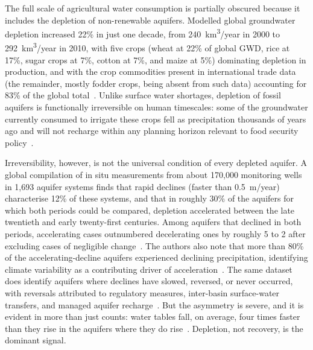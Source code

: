 The full scale of agricultural water consumption is partially obscured because it includes the depletion of non-renewable aquifers. Modelled global groundwater depletion increased 22\% in just one decade, from 240~km\textsuperscript{3}/year in 2000 to 292~km\textsuperscript{3}/year in 2010, with five crops (wheat at 22\% of global GWD, rice at 17\%, sugar crops at 7\%, cotton at 7\%, and maize at 5\%) dominating depletion in production, and with the crop commodities present in international trade data (the remainder, mostly fodder crops, being absent from such data) accounting for 83\% of the global total~\cite[p.~701, Fig.~1]{dalin2017groundwater}. Unlike surface water shortages, depletion of fossil aquifers is functionally irreversible on human timescales: some of the groundwater currently consumed to irrigate these crops fell as precipitation thousands of years ago and will not recharge within any planning horizon relevant to food security policy~\cite[pp.~6--7]{kuang2024groundwater}.

Irreversibility, however, is not the universal condition of every depleted aquifer. A global compilation of in situ measurements from about 170{,}000 monitoring wells in 1{,}693 aquifer systems finds that rapid declines (faster than 0.5~m/year) characterise 12\% of these systems, and that in roughly 30\% of the aquifers for which both periods could be compared, depletion accelerated between the late twentieth and early twenty-first centuries. Among aquifers that declined in both periods, accelerating cases outnumbered decelerating ones by roughly 5 to 2 after excluding cases of negligible change~\cite[Abstract; pp.~715--717]{jasechko2024decline}. The authors also note that more than 80\% of the accelerating-decline aquifers experienced declining precipitation, identifying climate variability as a contributing driver of acceleration~\cite[pp.~717--718]{jasechko2024decline}. The same dataset does identify aquifers where declines have slowed, reversed, or never occurred, with reversals attributed to regulatory measures, inter-basin surface-water transfers, and managed aquifer recharge~\cite[pp.~718--719]{jasechko2024decline}. But the asymmetry is severe, and it is evident in more than just counts: water tables fall, on average, four times faster than they rise in the aquifers where they do rise~\cite[p.~719]{jasechko2024decline}. Depletion, not recovery, is the dominant signal.

